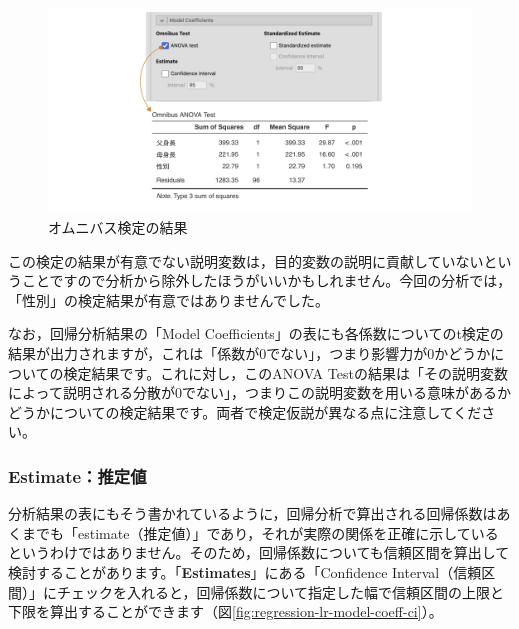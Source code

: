 \documentclass[
  12pt,
  a5jpaper,
  lualatex, ja=standard]{bxjsbook}
\begin{document}
\begin{figure}[!ht]

{\centering \includegraphics[width=1\linewidth]{images/regression/lr-model-coeff-anova} 

}

\caption{オムニバス検定の結果}\label{fig:regression-lr-model-coeff-anova}
\end{figure}

この検定の結果が有意でない説明変数は，目的変数の説明に貢献していないということですので分析から除外したほうがいいかもしれません。今回の分析では，「性別」の検定結果が有意ではありませんでした。

なお，回帰分析結果の「Model Coefficients」の表にも各係数についてのt検定の結果が出力されますが，これは「係数が0でない」，つまり影響力が0かどうかについての検定結果です。これに対し，このANOVA Testの結果は「その説明変数によって説明される分散が0でない」，つまりこの説明変数を用いる意味があるかどうかについての検定結果です。両者で検定仮説が異なる点に注意してください。

\hypertarget{estimateux63a8ux5b9aux5024}{%
\subsubsection*{Estimate：推定値}\label{estimateux63a8ux5b9aux5024}}

分析結果の表にもそう書かれているように，回帰分析で算出される回帰係数はあくまでも「estimate（推定値）」であり，それが実際の関係を正確に示しているというわけではありません。そのため，回帰係数についても信頼区間を算出して検討することがあります。「\textbf{Estimates}」にある「Confidence Interval（信頼区間）」にチェックを入れると，回帰係数について指定した幅で信頼区間の上限と下限を算出することができます（図\ref{fig:regression-lr-model-coeff-ci}）。
\end{document}
